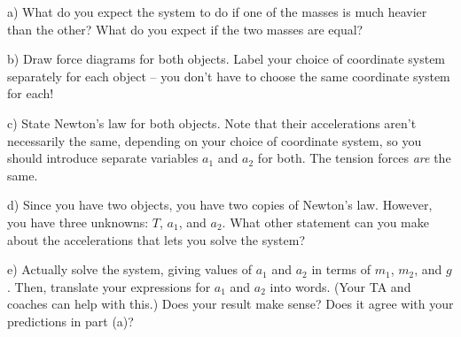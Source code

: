 \documentclass[12pt]{article}
\begin{document}
a) What do you expect the system to do if one of the masses is much heavier than the other? What do you expect if the
two masses are equal?

\vspace{1in}

b) Draw force diagrams for both objects. Label your choice of coordinate system separately for each object -- you don't have to choose the same coordinate system for each! 

\vspace{2in}

c) State Newton's law for both objects. Note that their accelerations aren't necessarily the same, depending on your choice of coordinate system, so you should introduce separate variables $a_1$ and $a_2$ for both. The tension forces
{\it are} the same.

\newpage

d) Since you have two objects, you have two copies of Newton's law. However, you have three unknowns: $T$, $a_1$, and $a_2$. What other statement can you make about the accelerations that lets you solve the system?

\vspace{3in}

e) Actually solve the system, giving values of $a_1$ and $a_2$ in terms of $m_1$, $m_2$, and $g$. Then, translate 
your expressions for $a_1$ and $a_2$ into words. (Your TA and coaches can help with this.) Does your result make sense?
Does it agree with your predictions in part (a)? 
\end{document}

